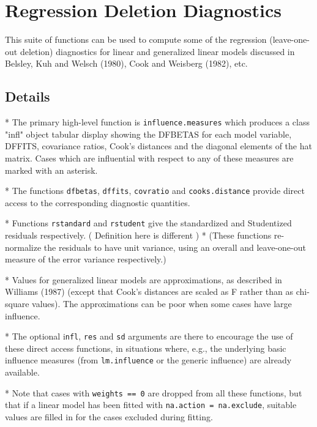 

\Large

\section{Regression Deletion Diagnostics}

This suite of functions can be used to compute some of the regression (leave-one-out deletion) diagnostics for linear and generalized linear models discussed in Belsley, Kuh and Welsch (1980), Cook and Weisberg (1982), etc.

\subsection*{Details}

*   The primary high-level function is \texttt{influence.measures} which produces a class "infl" object tabular display showing the DFBETAS for each model variable, DFFITS, covariance ratios, Cook's distances and the diagonal elements of the hat matrix. Cases which are influential with respect to any of these measures are marked with an asterisk. 
	
*   The functions \texttt{dfbetas}, \texttt{dffits}, \texttt{covratio} and \texttt{cooks.distance} provide direct access to the corresponding diagnostic quantities. 
	
*   Functions \texttt{rstandard} and \texttt{rstudent} give the standardized and Studentized residuals respectively. 
	( Definition here is different )
*   (These functions re-normalize the residuals to have unit variance, using an overall and leave-one-out measure of the error variance respectively.) 
	
*   Values for generalized linear models are approximations, as described in Williams (1987) (except that Cook's distances are scaled as F rather than as chi-square values). The approximations can be poor when some cases have large influence. 
	
*   The optional i\texttt{nfl}, \texttt{res} and \texttt{sd} arguments are there to encourage the use of these direct access functions, in situations where, e.g., the underlying basic influence measures (from \texttt{lm.influence} or the generic influence) are already available. 
	
*   Note that cases with \texttt{weights == 0} are dropped from all these functions, but that if a linear model has been fitted with \texttt{na.action = na.exclude}, suitable values are filled in for the cases excluded during fitting. 
	
